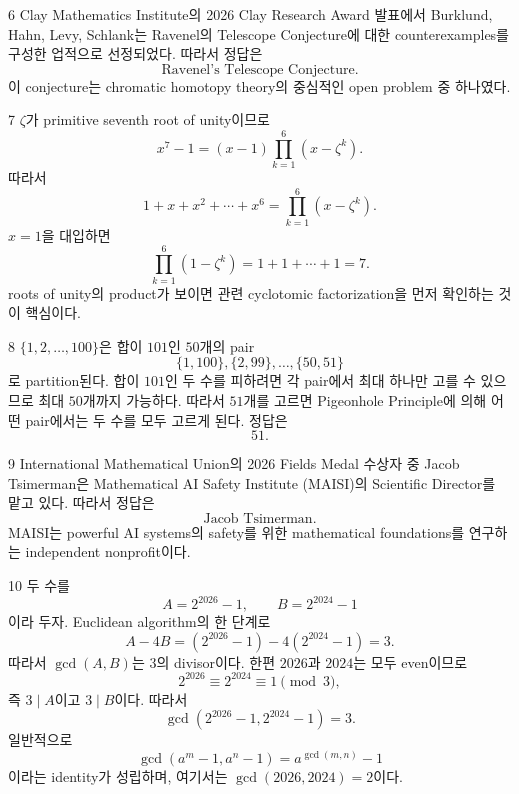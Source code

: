 \documentclass[11pt,oneside]{article}
\begin{document}
\begin{problemsolution}{6}
Clay Mathematics Institute의 2026 Clay Research Award 발표에서 Burklund, Hahn, Levy, Schlank는 Ravenel의 Telescope Conjecture에 대한 counterexamples를 구성한 업적으로 선정되었다. 따라서 정답은
\[
    \boxed{\text{Ravenel's Telescope Conjecture}}.
\]
이 conjecture는 chromatic homotopy theory의 중심적인 open problem 중 하나였다.
\end{problemsolution}

\newpage

\begin{problemsolution}{7}
$\zeta$가 primitive seventh root of unity이므로
\[
    x^7-1=(x-1)\prod_{k=1}^{6}(x-\zeta^k).
\]
따라서
\[
    1+x+x^2+\cdots+x^6
    =\prod_{k=1}^{6}(x-\zeta^k).
\]
$x=1$을 대입하면
\[
    \prod_{k=1}^{6}(1-\zeta^k)
    =1+1+\cdots+1
    =\boxed{7}.
\]
roots of unity의 product가 보이면 관련 cyclotomic factorization을 먼저 확인하는 것이 핵심이다.
\end{problemsolution}

\begin{problemsolution}{8}
$\{1,2,\ldots,100\}$은 합이 $101$인 $50$개의 pair
\[
    \{1,100\},\{2,99\},\ldots,\{50,51\}
\]
로 partition된다. 합이 $101$인 두 수를 피하려면 각 pair에서 최대 하나만 고를 수 있으므로 최대 $50$개까지 가능하다. 따라서 $51$개를 고르면 Pigeonhole Principle에 의해 어떤 pair에서는 두 수를 모두 고르게 된다. 정답은
\[
    \boxed{51}.
\]
\end{problemsolution}

\begin{problemsolution}{9}
International Mathematical Union의 2026 Fields Medal 수상자 중 Jacob Tsimerman은 Mathematical AI Safety Institute (MAISI)의 Scientific Director를 맡고 있다. 따라서 정답은
\[
    \boxed{\text{Jacob Tsimerman}}.
\]
MAISI는 powerful AI systems의 safety를 위한 mathematical foundations를 연구하는 independent nonprofit이다.
\end{problemsolution}

\begin{problemsolution}{10}
두 수를
\[
    A=2^{2026}-1,
    \qquad
    B=2^{2024}-1
\]
이라 두자. Euclidean algorithm의 한 단계로
\[
    A-4B
    =(2^{2026}-1)-4(2^{2024}-1)
    =3.
\]
따라서 $\gcd(A,B)$는 $3$의 divisor이다. 한편 $2026$과 $2024$는 모두 even이므로
\[
    2^{2026}\equiv2^{2024}\equiv1\pmod3,
\]
즉 $3\mid A$이고 $3\mid B$이다. 따라서
\[
    \boxed{\gcd\!\left(2^{2026}-1,2^{2024}-1\right)=3}.
\]
일반적으로
\[
    \gcd(a^m-1,a^n-1)=a^{\gcd(m,n)}-1
\]
이라는 identity가 성립하며, 여기서는 $\gcd(2026,2024)=2$이다.
\end{problemsolution}
\end{document}
